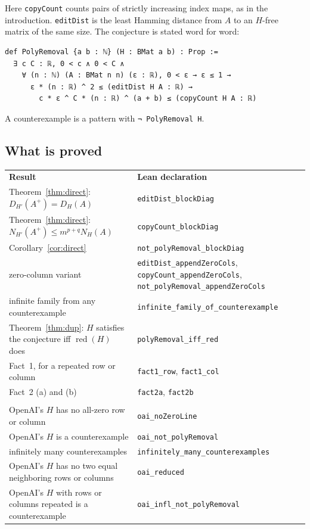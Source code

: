 \documentclass{article}
\theoremstyle{plain}
\theoremstyle{definition}
\begin{document}
\medskip
Here \texttt{copyCount} counts pairs of strictly increasing index maps, as in
the introduction. \texttt{editDist} is the least Hamming distance from $A$ to
an $H$-free matrix of the same size. The conjecture is stated word for word:
\begin{lstlisting}
def PolyRemoval {a b : ℕ} (H : BMat a b) : Prop :=
  ∃ c C : ℝ, 0 < c ∧ 0 < C ∧
    ∀ (n : ℕ) (A : BMat n n) (ε : ℝ), 0 < ε → ε ≤ 1 →
      ε * (n : ℝ) ^ 2 ≤ (editDist H A : ℝ) →
        c * ε ^ C * (n : ℝ) ^ (a + b) ≤ (copyCount H A : ℝ)
\end{lstlisting}
A counterexample is a pattern with \lstinline[basicstyle=\ttfamily]|¬ PolyRemoval H|.

\subsection*{What is proved}

\medskip
{\small
\begin{tabular}{@{}>{\raggedright\arraybackslash}p{}@{\quad}>{\raggedright\arraybackslash}p{}@{}}
  \textbf{Result} & \textbf{Lean declaration}\\[2pt]
  Theorem~\ref{thm:direct}: $D_{H'}(A^+)=D_H(A)$ & \texttt{editDist\_blockDiag}\\
  Theorem~\ref{thm:direct}: $N_{H'}(A^+)\le m^{p+q}N_H(A)$ & \texttt{copyCount\_blockDiag}\\
  Corollary~\ref{cor:direct} & \texttt{not\_polyRemoval\_blockDiag}\\
  zero-column variant & \texttt{editDist\_appendZeroCols}, \texttt{copyCount\_appendZeroCols}, \texttt{not\_polyRemoval\_appendZeroCols}\\
  infinite family from any counterexample & \texttt{infinite\_family\_of\_counterexample}\\
Theorem~\ref{thm:dup}: $H$ satisfies the conjecture iff $\operatorname{red}(H)$ does & \texttt{polyRemoval\_iff\_red}\\
Fact~1, for a repeated row or column & \texttt{fact1\_row}, \texttt{fact1\_col}\\
Fact~2 (a) and (b) & \texttt{fact2a}, \texttt{fact2b}\\[4pt]
  \multicolumn{2}{@{}l}{\emph{In \texttt{lean-unconditional/} only:}}\\[1pt]
  OpenAI's $H$ has no all-zero row or column & \texttt{oai\_noZeroLine}\\
  OpenAI's $H$ is a counterexample & \texttt{oai\_not\_polyRemoval}\\
  infinitely many counterexamples & \texttt{infinitely\_many\_counterexamples}\\
OpenAI's $H$ has no two equal neighboring rows or columns & \texttt{oai\_reduced}\\
OpenAI's $H$ with rows or columns repeated is a counterexample & \texttt{oai\_infl\_not\_polyRemoval}
\end{tabular}}
\end{document}
